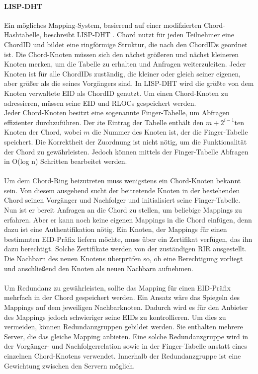 \paragraph{LISP-DHT} 
Ein mögliches Mapping-System, basierend auf einer modifzierten Chord-Hashtabelle, beschreibt LISP-DHT \cite{mathy:2008:dht}. Chord nutzt für jeden Teilnehmer eine ChordID und bildet eine ringförmige Struktur, die nach den ChordIDs geordnet ist. Die Chord-Knoten müssen sich den nächst größeren und nächst kleineren Knoten merken, um die Tabelle zu erhalten und Anfragen weiterzuleiten. Jeder Knoten ist für alle ChordIDs zuständig, die kleiner oder gleich seiner eigenen, aber größer als die seines Vorgängers sind. In LISP-DHT wird die größte von dem Knoten verwaltete EID als ChordID genutzt. Um einen Chord-Knoten zu adressieren, müssen seine EID und RLOCs gespeichert werden. \\
Jeder Chord-Knoten besitzt eine sogenannte Finger-Tabelle, um Abfragen effizienter durchzuführen. Der $i$te Eintrag der Tabelle enthält den $m+2^{i-1}$ten Knoten der Chord, wobei $m$ die Nummer des Knoten ist, der die Finger-Tabelle speichert. Die Korrektheit der Zuordnung ist nicht nötig, um die Funktionalität der Chord zu gewährleisten. Jedoch können mittels der Finger-Tabelle Abfragen in O(log n) Schritten bearbeitet werden.

\paragraph{}
Um  dem Chord-Ring beizutreten muss wenigstens ein Chord-Knoten bekannt sein. Von diesem ausgehend sucht der beitretende Knoten in der bestehenden Chord seinen Vorgänger und  Nachfolger und initialisiert seine Finger-Tabelle. Nun ist er bereit Anfragen an die Chord zu stellen, um beliebige Mappings zu erfahren. Aber er kann noch keine eigenen Mappings in die Chord einfügen, denn dazu ist eine Authentifikation nötig. Ein Knoten, der Mappings für einen bestimmten EID-Präfix liefern möchte, muss über ein Zertifikat verfügen, das ihn dazu berechtigt. Solche Zertifikate werden von der zuständigen RIR ausgestellt. Die Nachbarn des neuen Knotens überprüfen so, ob eine Berechtigung vorliegt und anschließend den Knoten als neuen Nachbarn aufnehmen. 

\paragraph{}
Um Redundanz zu gewährleisten, sollte das Mapping für einen EID-Präfix mehrfach in der Chord gespeichert werden. Ein Ansatz wäre das Spiegeln des Mappings auf dem jeweiligen Nachbarknoten. Dadurch wird es für den Anbieter des Mappings jedoch schwieriger seine EIDs zu kontrollieren. Um dies zu vermeiden, können Redundanzgruppen gebildet werden. Sie enthalten mehrere Server, die das gleiche Mapping anbieten. Eine solche Redundanzgruppe wird in der Vorgänger- und Nachfolgerrelation sowie in der Finger-Tabelle anstatt eines einzelnen Chord-Knotens verwendet. Innerhalb der Redundanzgruppe ist eine Gewichtung zwischen den Servern möglich.

